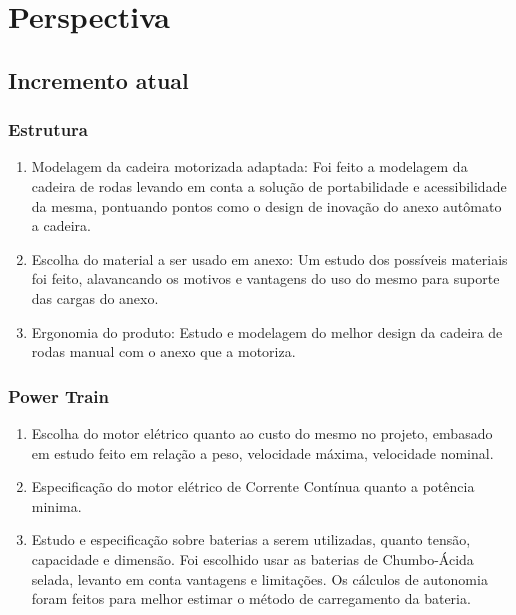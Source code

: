 \chapter[Perspectiva]{Perspectiva}

\section{Incremento atual}
  \subsection{Estrutura}
    \begin{enumerate}
      \item Modelagem da cadeira motorizada adaptada: Foi feito a modelagem da cadeira de rodas levando em conta a solução de portabilidade e acessibilidade da mesma, pontuando pontos como o design de inovação do anexo autômato a cadeira.

      \item Escolha do material a ser usado em anexo: Um estudo dos possíveis materiais foi feito, alavancando os motivos e vantagens do uso do mesmo para suporte das cargas do anexo.

      \item Ergonomia do produto: Estudo e modelagem do melhor design da cadeira de rodas manual com o anexo que a motoriza.
    \end{enumerate}
  \subsection{Power Train}
    \begin{enumerate}
      \item Escolha do motor elétrico quanto ao custo do mesmo no projeto, embasado em estudo feito em relação a peso, velocidade máxima, velocidade nominal.
      \item Especificação do motor elétrico de Corrente Contínua quanto a potência minima.
      \item Estudo e especificação sobre baterias a serem utilizadas, quanto tensão, capacidade e dimensão. Foi escolhido usar as baterias de Chumbo-Ácida selada, levanto em conta vantagens e limitações. Os cálculos de autonomia foram feitos para melhor estimar o método de carregamento da bateria.
    \end{enumerate}

